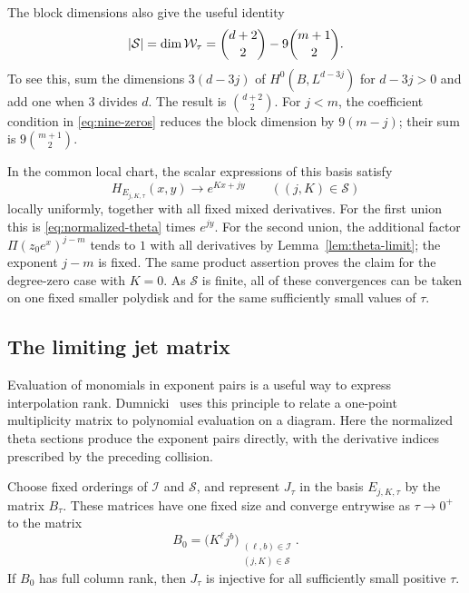 The block dimensions also give the useful identity
\[
 |\mathcal S|=\dim\mathcal W_\tau
 =\binom{d+2}{2}-9\binom{m+1}{2}.
\]
To see this, sum the dimensions $3(d-3j)$ of
$H^0(B,L^{d-3j})$ for $d-3j>0$ and add one when $3$ divides $d$.
The result is
$\binom{d+2}{2}$. For $j<m$, the coefficient condition in
\eqref{eq:nine-zeros} reduces the block dimension by $9(m-j)$;
their sum is $9\binom{m+1}{2}$.

In the common local chart, the scalar expressions of this basis
satisfy
\[
 H_{E_{j,K,\tau}}(x,y)\longrightarrow e^{Kx+jy}
 \qquad((j,K)\in\mathcal S)
\]
locally uniformly, together with all fixed mixed derivatives.
For the first union this is \eqref{eq:normalized-theta} times
$e^{jy}$. For the second union, the additional factor
$\Pi(z_0e^x)^{j-m}$ tends to $1$ with all derivatives by
Lemma~\ref{lem:theta-limit}; the exponent $j-m$ is fixed.
The same product assertion proves the claim for the degree-zero
case with $K=0$. As $\mathcal S$ is finite, all of these
convergences can be taken on one fixed smaller polydisk and for
the same sufficiently small values of $\tau$.

\subsection{The limiting jet matrix}

Evaluation of monomials in exponent pairs is a useful way to express
interpolation rank. Dumnicki~\cite[proof of Proposition~13]{Dumnicki2007} uses
this principle to relate a one-point multiplicity matrix to polynomial
evaluation on a diagram. Here the normalized theta sections produce
the exponent pairs directly, with the derivative indices prescribed
by the preceding collision.

\begin{proposition}
\label{prop:matrix-limit}
Choose fixed orderings of $\mathcal I$ and $\mathcal S$, and
represent $J_\tau$ in the basis $E_{j,K,\tau}$ by the matrix
$B_\tau$. These matrices have one fixed size and converge
entrywise as $\tau\to0^+$ to the matrix
\begin{equation}
 B_0=\bigl(K^\ell j^b\bigr)_
              {\substack{(\ell,b)\in\mathcal I\\(j,K)\in\mathcal S}}.
 \label{eq:limiting-matrix}
\end{equation}
If $B_0$ has full column rank, then $J_\tau$ is injective for all
sufficiently small positive $\tau$.
\end{proposition}

